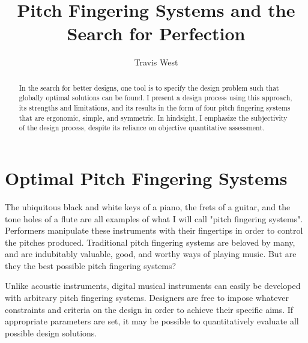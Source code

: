 \documentclass[sigconf]{nimeart}
\begin{document}
\title[Pitch Fingering Systems and the Search for Perfection]{Pitch Fingering Systems and the Search for Perfection}
\author{Travis West}
\renewcommand{\shortauthors}{West}
\begin{abstract}
In the search for better designs, one tool is to specify the design problem such that globally optimal solutions can be found. I present a design process using this approach, its strengths and limitations, and its results in the form of four pitch fingering systems that are ergonomic, simple, and symmetric. In hindsight, I emphasize the subjectivity of the design process, despite its reliance on objective quantitative assessment.
\end{abstract}

\maketitle
\section{Optimal Pitch Fingering Systems}\label{optimal-pitch-fingering-systems}

The ubiquitous black and white keys of a piano, the frets of a guitar, and the tone holes of a flute are all examples of what I will call "pitch fingering systems". Performers manipulate these instruments with their fingertips in order to control the pitches produced. Traditional pitch fingering systems are beloved by many, and are indubitably valuable, good, and worthy ways of playing music. But are they the best possible pitch fingering systems?

Unlike acoustic instruments, digital musical instruments can easily be developed with arbitrary pitch fingering systems. Designers are free to impose whatever constraints and criteria on the design in order to achieve their specific aims. If appropriate parameters are set, it may be possible to quantitatively evaluate all possible design solutions.
\end{document}

